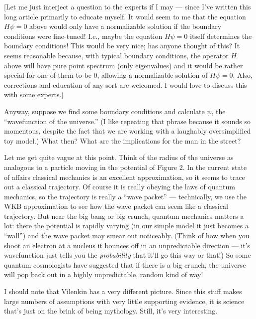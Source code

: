 \documentclass[12pt]{article}
\def\tightlist{}
\renewcommand{\texttt}[1]{%
  \begingroup
  \ttfamily
  \begingroup\lccode`~=`/\lowercase{\endgroup\def~}{/\discretionary{}{}{}}%
  \begingroup\lccode`~=`[\lowercase{\endgroup\def~}{[\discretionary{}{}{}}%
  \begingroup\lccode`~=`.\lowercase{\endgroup\def~}{.\discretionary{}{}{}}%
  \catcode`/=\active\catcode`[=\active\catcode`.=\active
  \scantokens{#1\noexpand}%
  \endgroup
}
\begin{document}
{[}Let me just interject a question to the experts if I may --- since
I've written this long article primarily to educate myself. It would
seem to me that the equation \(H \psi = 0\) above would only have a
normalizable solution if the boundary conditions were fine-tuned! I.e.,
maybe the equation \(H \psi = 0\) itself determines the boundary
conditions! This would be very nice; has anyone thought of this? It
seems reasonable because, with typical boundary conditions, the operator
\(H\) above will have pure point spectrum (only eigenvalues) and it
would be rather special for one of them to be \(0\), allowing a
normalizable solution of \(H \psi = 0\). Also, corrections and education
of any sort are welcomed. I would love to discuss this with some
experts.{]}

Anyway, suppose we find some boundary conditions and calculate \(\psi\),
the ``wavefunction of the universe.'' (I like repeating that phrase
because it sounds so momentous, despite the fact that we are working
with a laughably oversimplified toy model.) What then? What are the
implications for the man in the street?

Let me get quite vague at this point. Think of the radius of the
universe as analogous to a particle moving in the potential of Figure 2.
In the current state of affairs classical mechanics is an excellent
approximation, so it seems to trace out a classical trajectory. Of
course it is really obeying the laws of quantum mechanics, so the
trajectory is really a ``wave packet'' --- technically, we use the WKB
approximation to see how the wave packet can seem like a classical
trajectory. But near the big bang or big crunch, quantum mechanics
matters a lot: there the potential is rapidly varying (in our simple
model it just becomes a ``wall'') and the wave packet may smear out
noticeably. (Think of how when you shoot an electron at a nucleus it
bounces off in an unpredictable direction --- it's wavefunction just
tells you the \emph{probability} that it'll go this way or that!) So
some quantum cosmologists have suggested that if there is a big crunch,
the universe will pop back out in a highly unpredictable, random kind of
way!

I should note that Vilenkin has a very different picture. Since this
stuff makes large numbers of assumptions with very little supporting
evidence, it is science that's just on the brink of being mythology.
Still, it's very interesting.

\end{document}
